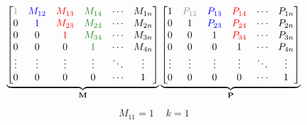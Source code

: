 
\begin{figure*}[tbp]
	\centering
	\begin{minipage}{\textwidth}
		 \[
 \underbrace{\left[
\begin{matrix}
 \textcolor{gray}{1}  &\textcolor{blue}{M_{12}}  &\textcolor{red}{M_{13}}   &\textcolor{ForestGreen}{M_{14}}      & \cdots    & M_{1n} \\
 0                    &\textcolor{blue}{1}   	 &\textcolor{red}{M_{23}}   &\textcolor{ForestGreen}{M_{24}}      & \cdots    & M_{2n} \\
 0                    &0             			 &\textcolor{red}{1}   	    &\textcolor{ForestGreen}{M_{34}}      & \cdots    & M_{3n} \\
 0                    &0             			 &0             			&\textcolor{ForestGreen}{1}   		& \cdots    & M_{4n} \\
 \vdots    		      &\vdots            		 & \vdots       			&\vdots       				    & \ddots    & \vdots \\
 0         		      &0             			 &0                         &0             				    & \cdots    & 1      \\
\end{matrix}   
\right]}_{\textbf{M}} 
 \underbrace{\left[
\begin{matrix}
 1         &\textcolor{gray}{P_{12}}       &\textcolor{blue}{P_{13}}       &\textcolor{red}{P_{14}}        & \cdots    & P_{1n} \\
 0         &1             	    		   &\textcolor{blue}{P_{23}}       &\textcolor{red}{P_{24}}        & \cdots    & P_{2n} \\
 0         &0             				   &1					   		   &\textcolor{red}{P_{34}}         & \cdots    & P_{3n} \\
 0         &0             				   &0             				   &1					  		    & \cdots    & P_{4n} \\
 \vdots    &\vdots            			   & \vdots       				   & \vdots       				    & \ddots    & \vdots \\
 0         &0             				   &0                              &0             					& \cdots    & 1      \\
\end{matrix}   
\right]}_{\textbf{P}}
\]
\[
\begin{alignedat}{3}
&\begin{array}{rl}&M_{11} = 1 \end{array} &k =1\ \ \ \ \ &\\ 

\end{alignedat}\]
\end{minipage}
\end{figure*}
